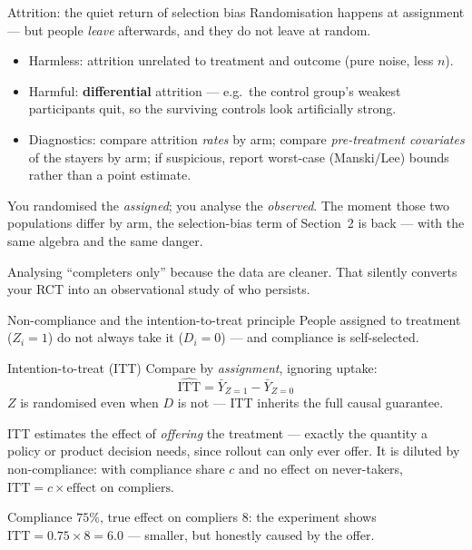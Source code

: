 \documentclass[aspectratio=169,11pt]{beamer}
\begin{document}
\begin{frame}{Attrition: the quiet return of selection bias}
  \footnotesize
  Randomisation happens at assignment --- but people \emph{leave} afterwards, and they do
  not leave at random.
  \begin{readme}
    \begin{itemize}
      \item Harmless: attrition unrelated to treatment and outcome (pure noise, less $n$).
      \item Harmful: \textbf{differential} attrition --- e.g.\ the control group's
            weakest participants quit, so the surviving controls look artificially strong.
      \item Diagnostics: compare attrition \emph{rates} by arm; compare
            \emph{pre-treatment covariates} of the stayers by arm; if suspicious, report
            worst-case (Manski/Lee) bounds rather than a point estimate.
    \end{itemize}
  \end{readme}
  \begin{takeaway}
    You randomised the \emph{assigned}; you analyse the \emph{observed}. The moment those
    two populations differ by arm, the selection-bias term of Section~2 is back --- with
    the same algebra and the same danger.
  \end{takeaway}
  \begin{mistake}
    Analysing ``completers only'' because the data are cleaner. That silently converts
    your RCT into an observational study of who persists.
  \end{mistake}
\end{frame}

\begin{frame}{Non-compliance and the intention-to-treat principle}
  \footnotesize
  People assigned to treatment ($Z_i = 1$) do not always take it ($D_i = 0$) --- and
  compliance is self-selected.
  \begin{block}{Intention-to-treat (ITT)}
    Compare by \emph{assignment}, ignoring uptake:
    \[
      \boxed{\;\widehat{\mathrm{ITT}} = \bar Y_{Z=1} - \bar Y_{Z=0}\;}
    \]
    $Z$ is randomised even when $D$ is not --- ITT inherits the full causal guarantee.
  \end{block}
  \begin{readme}
    ITT estimates the effect of \emph{offering} the treatment --- exactly the quantity a
    policy or product decision needs, since rollout can only ever offer. It is diluted
    by non-compliance: with compliance share $c$ and no effect on never-takers,
    $\mathrm{ITT} = c \times \text{effect on compliers}$.
  \end{readme}
  \begin{numexample}
    Compliance $75\%$, true effect on compliers $8$: the experiment shows
    $\mathrm{ITT} = 0.75 \times 8 = \mathbf{6.0}$ --- smaller, but honestly caused by the
    offer.
  \end{numexample}
\end{frame}
\end{document}
